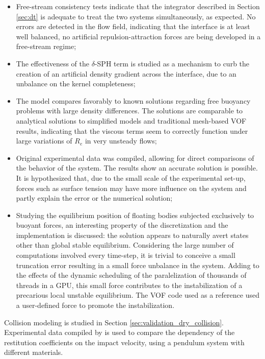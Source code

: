 \begin{itemize}
\item Free-stream consistency tests indicate that the integrator described in Section \ref{sec:dt} is adequate to treat the two systems simultaneously, as expected. No errors are detected in the flow field, indicating that the interface is at least well balanced, no artificial repulsion-attraction forces are being developed in a free-stream regime;
\item The effectiveness of the $\delta$-\ac{SPH} term is studied as a mechanism to curb the creation of an artificial density gradient across the interface, due to an unbalance on the kernel completeness;
\item The model compares favorably to known solutions regarding free buoyancy problems with large density differences. The solutions are comparable to analytical solutions to simplified models and traditional mesh-based \ac{VOF} results, indicating that the viscous terms seem to correctly function under large variations of $R_e$ in very unsteady flows;
\item Original experimental data was compiled, allowing for direct comparisons of the behavior of the system. The results show an accurate solution is possible. It is hypothesized that, due to the small scale of the experimental set-up, forces such as surface tension may have more influence on the system and partly explain the error or the numerical solution;
\item Studying the equilibrium position of floating bodies subjected exclusively to buoyant forces, an interesting property of the discretization and the implementation is discussed: the solution appears to naturally avert states other than global stable equilibrium. Considering the large number of computations involved every time-step, it is trivial to conceive a small truncation error resulting in a small force unbalance in the system. Adding to the effects of the dynamic scheduling of the paralelization of thousands of threads in a \ac{GPU}, this small force contributes to the instabilization of a precarious local unstable equilibrium. The \ac{VOF} code used as a reference used a user-defined force to promote the instabilization.
\end{itemize}

Collision modeling is studied in Section \ref{sec:validation_dry_collision}. Experimental data compiled by \cite{Kruggel-Emden-2007} is used to compare the dependency of the restitution coefficients on the impact velocity, using a pendulum system with different materials. 


